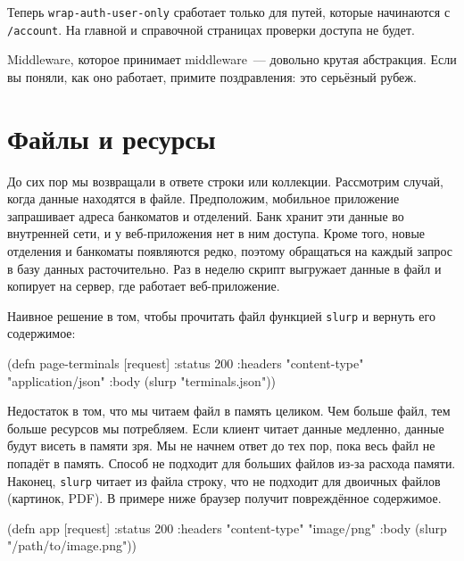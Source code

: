 
Теперь \verb|wrap-auth-user-only| сработает только для путей, которые
начинаются с \verb|/account|. На главной и справочной страницах проверки
доступа не будет.

Middleware, которое принимает middleware~--- довольно крутая абстракция. Если вы
поняли, как оно работает, примите поздравления: это серьёзный рубеж.

\section{Файлы и ресурсы}

\label{http-files}

До сих пор мы возвращали в ответе строки или коллекции. Рассмотрим случай, когда
данные находятся в файле. Предположим, мобильное приложение запрашивает адреса
банкоматов и отделений. Банк хранит эти данные во внутренней сети, и у
веб-приложения нет в ним доступа. Кроме того, новые отделения и банкоматы
появляются редко, поэтому обращаться на каждый запрос в базу данных
расточительно. Раз в неделю скрипт выгружает данные в файл и копирует на сервер,
где работает веб-приложение.


Наивное решение в том, чтобы прочитать файл функцией \verb|slurp| и вернуть
его содержимое:

\begin{english}
  \begin{clojure}
(defn page-terminals [request]
  {:status 200
   :headers {"content-type" "application/json"}
   :body (slurp "terminals.json")})
  \end{clojure}
\end{english}

Недостаток в том, что мы читаем файл в память целиком. Чем больше файл, тем
больше ресурсов мы потребляем. Если клиент читает данные медленно, данные будут
висеть в памяти зря. Мы не начнем ответ до тех пор, пока весь файл не
попадёт в память. Способ не подходит для больших файлов из-за расхода
памяти. Наконец, \verb|slurp| читает из файла строку, что не подходит для
двоичных файлов (картинок, PDF). В примере ниже браузер получит повреждённое
содержимое.

\begin{english}
  \begin{clojure}
(defn app [request]
  {:status 200
   :headers {"content-type" "image/png"}
   :body (slurp "/path/to/image.png")})
  \end{clojure}
\end{english}

